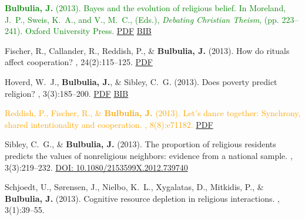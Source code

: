 \documentclass{article}
\begin{document}
\begin{thebibliography}{99}
\textcolor{Green}{
{\bf Bulbulia, J.} (2013).
\newblock Bayes and the evolution of religious belief.
\newblock In Moreland, J.~P., Sweis, K.~A., and V., M.~C., (Eds.), {\em
  Debating Christian Theism}, (pp. 223--241). Oxford University
  Press. } \href{https://www.dropbox.com/s/4r51rkx6hs45xv5/Bayes_Bulbulia.pdf}{PDF} \href{https://www.dropbox.com/s/bvynsi68no2bywu/2013.bulbulia.bayes.bib?dl=0}{BIB}


Fischer, R., Callander, R., Reddish, P., \& {\bf Bulbulia, J.} (2013).
\newblock How do rituals affect cooperation?
, 24(2):115--125.
\href{https://www.dropbox.com/s/isz3hm6j46x15jv/10.1007_s12110-013-9167-y.pdf}{PDF} %


Hoverd, W.~J., {\bf Bulbulia, J.}, \& Sibley, C.~G. (2013).
\newblock Does poverty predict religion?
, 3(3):185--200. \href{https://www.dropbox.com/s/vfc656k50e30u1c/pov_published.pdf}{PDF} \href{https://www.dropbox.com/s/sqjldzyphdvxi6q/2013.pov.bib?dl=0}{BIB}


\textcolor{Orange}{Reddish, P., Fischer, R., \& {\bf Bulbulia, J.} (2013).
\newblock Let's dance together: Synchrony, shared intentionality and
  cooperation.
, 8(8):e71182.} 
\href{https://www.dropbox.com/s/qhcenknup2xtetx/journal.pone.0071182.pdf}{PDF} %


Sibley, C.~G., \& {\bf Bulbulia, J.} (2013).
\newblock The proportion of religious residents predicts the values of
  nonreligious neighbors: evidence from a national sample.
, 3(3):219--232.
\href{https://doi.org/10.1080/2153599X.2012.739740}{DOI: 10.1080/2153599X.2012.739740}


Schjoedt, U., S{\o}rensen, J., Nielbo, K.~L., Xygalatas, D., Mitkidis, P., \&
  {\bf Bulbulia, J.} (2013).
\newblock Cognitive resource depletion in religious interactions.
, 3(1):39--55. 



\end{thebibliography}
\end{document}
